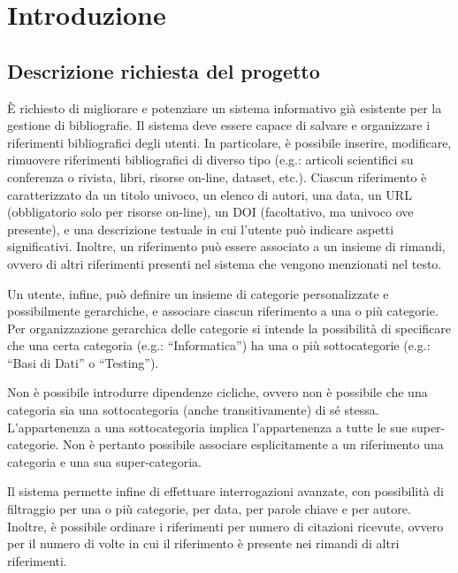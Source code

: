 \chapter{Introduzione}
\raggedright{\section{Descrizione richiesta del progetto}}

È richiesto di migliorare e potenziare un sistema informativo già esistente per la gestione di bibliografie. Il sistema deve essere capace di salvare e organizzare i riferimenti bibliografici degli utenti.  In particolare, è possibile inserire, modificare, rimuovere riferimenti bibliografici di diverso tipo (e.g.: articoli scientifici su conferenza o rivista, libri, risorse on-line, dataset, etc.).
Ciascun riferimento è caratterizzato da un titolo univoco, un elenco di autori, una data, un URL (obbligatorio solo per risorse on-line), un DOI (facoltativo, ma univoco ove presente), e una descrizione testuale in cui l’utente può indicare aspetti significativi.
Inoltre, un riferimento può essere associato a un insieme di rimandi, ovvero di altri riferimenti presenti nel sistema che vengono menzionati nel testo.

Un utente, infine, può definire un insieme di categorie personalizzate e possibilmente gerarchiche, e associare ciascun riferimento a una o più categorie. Per organizzazione gerarchica delle categorie si intende la possibilità di specificare che una certa categoria (e.g.: “Informatica”) ha una o più sottocategorie (e.g.: “Basi di Dati” o “Testing”).

Non è possibile introdurre dipendenze cicliche, ovvero non è possibile che una categoria sia una sottocategoria (anche transitivamente) di sé stessa. L’appartenenza a una sottocategoria implica l’appartenenza a tutte le sue super-categorie. Non è pertanto possibile associare esplicitamente a un riferimento una categoria e una sua super-categoria.

Il sistema permette infine di effettuare interrogazioni avanzate, con possibilità di filtraggio per una o più categorie, per data, per parole chiave e per autore. Inoltre, è possibile ordinare i riferimenti per numero di citazioni ricevute, ovvero per il numero di volte in cui il riferimento è presente nei rimandi di altri riferimenti.

